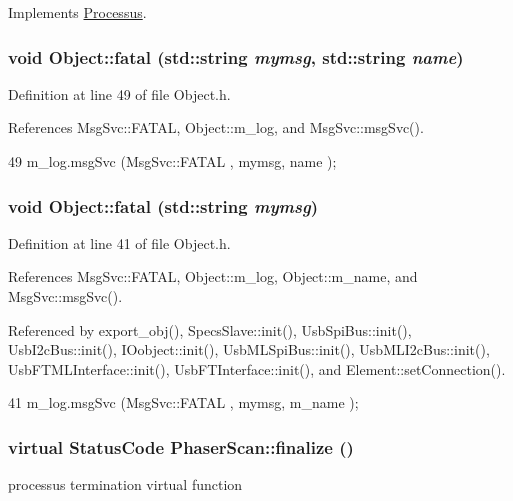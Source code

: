 Implements \hyperlink{classProcessus_a63767a63a1fb0055c5aa45b21a4a5d58}{Processus}.\hypertarget{classObject_ae62acd3d09f716220f75f252dc38bc9a}{
\subsubsection[{fatal}]{\setlength{\rightskip}{0pt plus 5cm}void Object::fatal (std::string {\em mymsg}, \/  std::string {\em name})}}
\label{classObject_ae62acd3d09f716220f75f252dc38bc9a}


Definition at line 49 of file Object.h.

References MsgSvc::FATAL, Object::m\_\-log, and MsgSvc::msgSvc().


\begin{DoxyCode}
49 { m_log.msgSvc (MsgSvc::FATAL   , mymsg, name ); }
\end{DoxyCode}
\hypertarget{classObject_aad5a16aac7516ce65bd5ec02ab07fc80}{
\subsubsection[{fatal}]{\setlength{\rightskip}{0pt plus 5cm}void Object::fatal (std::string {\em mymsg})}}
\label{classObject_aad5a16aac7516ce65bd5ec02ab07fc80}


Definition at line 41 of file Object.h.

References MsgSvc::FATAL, Object::m\_\-log, Object::m\_\-name, and MsgSvc::msgSvc().

Referenced by export\_\-obj(), SpecsSlave::init(), UsbSpiBus::init(), UsbI2cBus::init(), IOobject::init(), UsbMLSpiBus::init(), UsbMLI2cBus::init(), UsbFTMLInterface::init(), UsbFTInterface::init(), and Element::setConnection().


\begin{DoxyCode}
41 { m_log.msgSvc (MsgSvc::FATAL   , mymsg, m_name ); }
\end{DoxyCode}
\hypertarget{classPhaserScan_a505bd8dc2961fd220f1624cd949a266e}{
\subsubsection[{finalize}]{\setlength{\rightskip}{0pt plus 5cm}virtual {\bf StatusCode} PhaserScan::finalize ()}}
\label{classPhaserScan_a505bd8dc2961fd220f1624cd949a266e}
processus termination virtual function 

